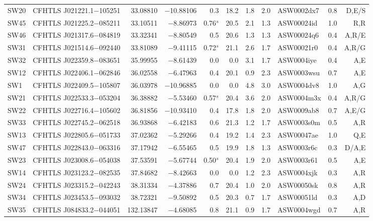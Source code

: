 \documentclass[useAMS,usenatbib,a4paper]{mn2e}
\begin{document}
\begin{center}
\begin{longtable}{llrrrrrrlrr}
SW20 & CFHTLS J021221.1$-$105251 &  33.08810 & $-$10.88106 &  0.3 & 18.2 &  1.8 &  2.0 & ASW0002dx7 &  0.8 &  D,E/S   \\
SW45 & CFHTLS J021225.2$-$085211 &  33.10511 &  $-$8.86973 &  0.76$^s$ & 20.5 &  2.1 &  1.3 & ASW00024id &  1.0 &  R,R   \\
SW46 & CFHTLS J021317.6$-$084819 &  33.32341 &  $-$8.80549 &  0.5 & 20.6 &  1.3 &  1.3 & ASW00024q6 &  0.4 &  A,R/E   \\
SW31 & CFHTLS J021514.6$-$092440 &  33.81089 &  $-$9.41115 &  0.72$^s$ & 21.1 &  2.6 &  1.7 & ASW00021r0 &  0.4 &  A,R/G   \\
SW32 & CFHTLS J022359.8$-$083651 &  35.99955 &  $-$8.61439 &  0.0 &  0.0 &  3.1 &  1.7 & ASW0004iye &  0.4 &  A,E   \\
SW12 & CFHTLS J022406.1$-$062846 &  36.02558 &  $-$6.47963 &  0.4 & 20.1 &  0.9 &  2.3 & ASW0003wsu &  0.7 &  A,E   \\
SW1 & CFHTLS J022409.5$-$105807 &  36.03978 & $-$10.96885 &  0.0 &  0.0 &  4.8 &  3.0 & ASW0004dv8 &  1.0 &  A,G   \\
SW21 & CFHTLS J022533.3$-$053204 &  36.38882 &  $-$5.53460 &  0.57$^s$ & 20.4 &  3.6 &  2.0 & ASW0004m3x &  0.4 &  A,R/G   \\
SW22 & CFHTLS J022716.4$-$105602 &  36.81856 & $-$10.93410 &  0.4 & 17.8 &  1.8 &  2.0 & ASW0009ab8 &  0.7 &  A,E/G   \\
SW33 & CFHTLS J022745.2$-$062518 &  36.93868 &  $-$6.42183 &  0.6 & 21.3 &  1.2 &  1.7 & ASW0003s0m &  0.5 &  A,R   \\
SW13 & CFHTLS J022805.6$-$051733 &  37.02362 &  $-$5.29266 &  0.4 & 19.2 &  1.4 &  2.3 & ASW00047ae &  1.0 &  Q,E   \\
SW47 & CFHTLS J022843.0$-$063316 &  37.17942 &  $-$6.55465 &  0.5 & 19.9 &  1.8 &  1.3 & ASW0003r6c &  0.3 &  D/A,E   \\
SW23 & CFHTLS J023008.6$-$054038 &  37.53591 &  $-$5.67744 &  0.50$^s$ & 20.4 &  1.9 &  2.0 & ASW0003r61 &  0.5 &  A,E   \\
SW14 & CFHTLS J023123.2$-$082535 &  37.84682 &  $-$8.42663 &  0.0 & 0.0 &  1.2 &  2.3 & ASW0004xjk &  0.3 &  A,R   \\
SW24 & CFHTLS J023315.2$-$042243 &  38.31334 &  $-$4.37886 &  0.7 & 20.4 &  1.0 &  2.0 & ASW00050sk &  0.8 &  A,R   \\
SW34 & CFHTLS J023453.5$-$093032 &  38.72321 &  $-$9.50892 &  0.5 & 20.3 &  0.7 &  1.7 & ASW00051ld &  0.3 &  A,D   \\
SW35 & CFHTLS J084833.2$-$044051 & 132.13847 &  $-$4.68085 &  0.8 & 21.1 &  0.9 &  1.7 & ASW0004wgd &  0.7 &  A,R   \\

\end{longtable}
\end{center}
\end{document}

